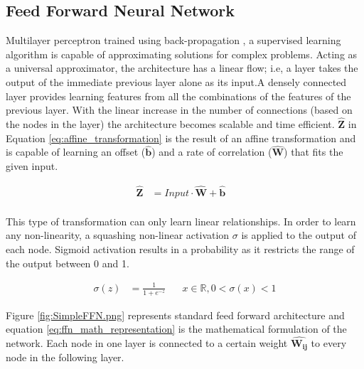 \documentclass{article}
\let\oldhat\hat
\renewcommand{\hat}[1]{\oldhat{\mathbf{#1}}}
\begin{document}
\subsection{Feed Forward Neural Network}
\label{sssec:ffn}
Multilayer perceptron trained using back-propagation \cite{Rumelhart1986LearningIR}, a supervised learning algorithm is capable of approximating solutions for complex problems. Acting as a universal approximator, the architecture has a linear flow; i.e, a layer takes the output of the immediate previous layer alone as its input.A densely connected layer provides learning features from all the combinations of the features of the previous layer. With the linear increase in the number of connections (based on the nodes in the layer) the architecture becomes scalable and time efficient. $\hat{Z}$ in Equation \ref{eq:affine_transformation} is the result of an affine transformation and is capable of learning an offset ($\hat{b}$) and a rate of correlation ($\hat{W}$) that fits the given input.

\begin{equation}
\label{eq:affine_transformation}
\begin{aligned}
\hat{Z} &= Input \cdot \hat{W} + \hat{b}&\\
\end{aligned}
\end{equation}

This type of transformation can only learn linear relationships. In order to learn any non-linearity, a squashing non-linear activation $\sigma$ \cite{Han1995TheIO} is applied to the output of each node. Sigmoid activation results in a probability as it restricts the range of the output between 0 and 1.

\begin{equation}
\label{eq:sigmoid_activation}
\begin{aligned}
\sigma(z) &= \frac{1}{1+e^{-z}} \;\;\;\;\;\;  x\in\mathbb{R}, 0<\sigma(x)<1
\end{aligned}
\end{equation}

Figure \ref{fig:SimpleFFN.png} represents standard feed forward architecture and equation \ref{eq:ffn_math_representation} is the mathematical formulation of the network. Each node in one layer is connected to a certain weight $\hat{W_{ij}}$ to every node in the following layer. 
\end{document}

